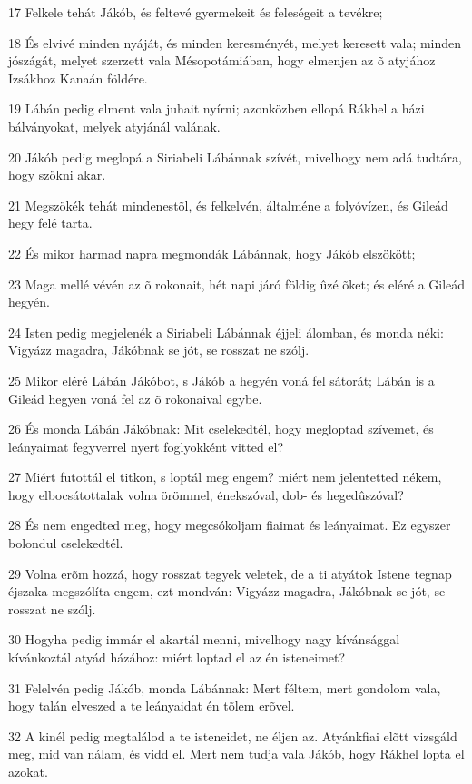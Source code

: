 \par 17 Felkele tehát Jákób, és feltevé gyermekeit és feleségeit a tevékre;
\par 18 És elvivé minden nyáját, és minden keresményét, melyet keresett vala; minden jószágát, melyet szerzett vala Mésopotámiában, hogy elmenjen az õ atyjához Izsákhoz Kanaán földére.
\par 19 Lábán pedig elment vala juhait nyírni; azonközben ellopá Rákhel a házi bálványokat, melyek atyjánál valának.
\par 20 Jákób pedig meglopá a Siriabeli Lábánnak szívét, mivelhogy nem adá tudtára, hogy szökni akar.
\par 21 Megszökék tehát mindenestõl, és felkelvén, általméne a folyóvízen, és Gileád hegy felé tarta.
\par 22 És mikor harmad napra megmondák Lábánnak, hogy Jákób elszökött;
\par 23 Maga mellé vévén az õ rokonait, hét napi járó földig ûzé õket; és eléré a Gileád hegyén.
\par 24 Isten pedig megjelenék a Siriabeli Lábánnak éjjeli álomban, és monda néki: Vigyázz magadra, Jákóbnak se jót, se rosszat ne szólj.
\par 25 Mikor eléré Lábán Jákóbot, s Jákób a hegyén voná fel sátorát; Lábán is a Gileád hegyen voná fel az õ rokonaival egybe.
\par 26 És monda Lábán Jákóbnak: Mit cselekedtél, hogy megloptad szívemet, és leányaimat fegyverrel nyert foglyokként vitted el?
\par 27 Miért futottál el titkon, s loptál meg engem? miért nem jelentetted nékem, hogy elbocsátottalak volna örömmel, énekszóval, dob- és hegedûszóval?
\par 28 És nem engedted meg, hogy megcsókoljam fiaimat és leányaimat. Ez egyszer bolondul cselekedtél.
\par 29 Volna erõm hozzá, hogy rosszat tegyek veletek, de a ti atyátok Istene tegnap éjszaka megszólíta engem, ezt mondván: Vigyázz magadra, Jákóbnak se jót, se rosszat ne szólj.
\par 30 Hogyha pedig immár el akartál menni, mivelhogy nagy kívánsággal kívánkoztál atyád házához: miért loptad el az én isteneimet?
\par 31 Felelvén pedig Jákób, monda Lábánnak: Mert féltem, mert gondolom vala, hogy talán elveszed a te leányaidat én tõlem erõvel.
\par 32 A kinél pedig megtalálod a te isteneidet, ne éljen az. Atyánkfiai elõtt vizsgáld meg, mid van nálam, és vidd el. Mert nem tudja vala Jákób, hogy Rákhel lopta el azokat.
